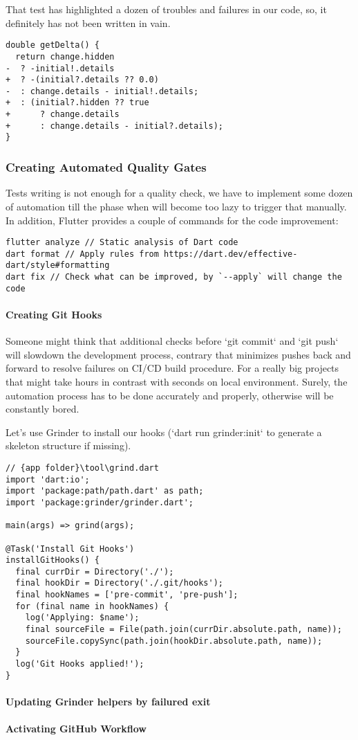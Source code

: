 That test has highlighted a dozen of troubles and failures in our code, so, it definitely has not been written in vain.

\begin{lstlisting}
double getDelta() {
  return change.hidden
-  ? -initial!.details
+  ? -(initial?.details ?? 0.0)
-  : change.details - initial!.details;
+  : (initial?.hidden ?? true
+      ? change.details
+      : change.details - initial?.details);
}
\end{lstlisting}

\subsubsection{Creating Automated Quality Gates}

Tests writing is not enough for a quality check, we have to implement some dozen of automation till the phase 
when will become too lazy to trigger that manually. In addition, Flutter provides a couple of commands for the 
code improvement:
\begin{lstlisting}
flutter analyze // Static analysis of Dart code
dart format // Apply rules from https://dart.dev/effective-dart/style#formatting
dart fix // Check what can be improved, by `--apply` will change the code
\end{lstlisting}

\paragraph{Creating Git Hooks}

Someone might think that additional checks before `git commit` and `git push` will slowdown the development process, 
contrary that minimizes pushes back and forward to resolve failures on CI/CD build procedure. For a really big projects
that might take hours in contrast with seconds on local environment. Surely, the automation process has to be done
accurately and properly, otherwise will be constantly bored.

Let's use Grinder to install our hooks (`dart run grinder:init` to generate a skeleton structure if missing).

\begin{lstlisting}
// {app folder}\tool\grind.dart
import 'dart:io';
import 'package:path/path.dart' as path;
import 'package:grinder/grinder.dart';

main(args) => grind(args);

@Task('Install Git Hooks')
installGitHooks() {
  final currDir = Directory('./');
  final hookDir = Directory('./.git/hooks');
  final hookNames = ['pre-commit', 'pre-push'];
  for (final name in hookNames) {
    log('Applying: $name');
    final sourceFile = File(path.join(currDir.absolute.path, name));
    sourceFile.copySync(path.join(hookDir.absolute.path, name));
  }
  log('Git Hooks applied!');
}
\end{lstlisting}

\paragraph{Updating Grinder helpers by failured exit}

\paragraph{Activating GitHub Workflow}